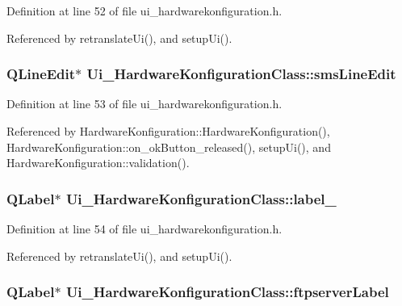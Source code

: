 Definition at line 52 of file ui\_\-hardwarekonfiguration.h.

Referenced by retranslateUi(), and setupUi().\hypertarget{class_ui___hardware_konfiguration_class_fc72e5b8861519cde9f6239f17cccb61}{
\subsubsection[smsLineEdit]{\setlength{\rightskip}{0pt plus 5cm}QLineEdit$\ast$ {\bf Ui\_\-HardwareKonfigurationClass::smsLineEdit}}}
\label{class_ui___hardware_konfiguration_class_fc72e5b8861519cde9f6239f17cccb61}




Definition at line 53 of file ui\_\-hardwarekonfiguration.h.

Referenced by HardwareKonfiguration::HardwareKonfiguration(), HardwareKonfiguration::on\_\-okButton\_\-released(), setupUi(), and HardwareKonfiguration::validation().\hypertarget{class_ui___hardware_konfiguration_class_64d33b6f74e3d7e079f5816ae8a2ff3a}{
\subsubsection[label\_\-6]{\setlength{\rightskip}{0pt plus 5cm}QLabel$\ast$ {\bf Ui\_\-HardwareKonfigurationClass::label\_}}}
\label{class_ui___hardware_konfiguration_class_64d33b6f74e3d7e079f5816ae8a2ff3a}




Definition at line 54 of file ui\_\-hardwarekonfiguration.h.

Referenced by retranslateUi(), and setupUi().\hypertarget{class_ui___hardware_konfiguration_class_7865898e0d9de7ebfa36092553af4933}{
\subsubsection[ftpserverLabel]{\setlength{\rightskip}{0pt plus 5cm}QLabel$\ast$ {\bf Ui\_\-HardwareKonfigurationClass::ftpserverLabel}}}
\label{class_ui___hardware_konfiguration_class_7865898e0d9de7ebfa36092553af4933}




